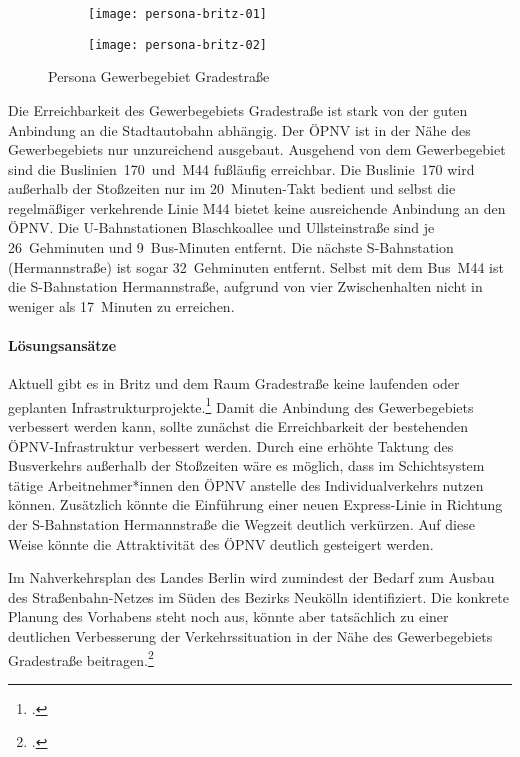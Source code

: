 \begin{figure}
    \centering
    \begin{subfigure}{.5\textwidth}
        \centering
        \texttt{[image: persona-britz-01]}
    \end{subfigure}%
    \begin{subfigure}{.5\textwidth}
        \centering
        \texttt{[image: persona-britz-02]}
    \end{subfigure}
    \caption{Persona Gewerbegebiet Gradestraße}
    \label{persona-britz}
\end{figure}

Die Erreichbarkeit des Gewerbegebiets Gradestraße ist stark von der guten Anbindung an die Stadtautobahn abhängig. Der ÖPNV ist in der Nähe des Gewerbegebiets nur unzureichend ausgebaut. Ausgehend von dem Gewerbegebiet sind die Buslinien~170~und~M44 fußläufig erreichbar. Die Buslinie~170 wird außerhalb der Stoßzeiten nur im 20~Minuten-Takt bedient und selbst die regelmäßiger verkehrende Linie M44 bietet keine ausreichende Anbindung an den ÖPNV. Die U-Bahnstationen Blaschkoallee und Ullsteinstraße sind je 26~Gehminuten und 9~Bus-Minuten entfernt. Die nächste S-Bahnstation (Hermannstraße) ist sogar 32~Gehminuten entfernt. Selbst mit dem Bus~M44 ist die S-Bahnstation Hermannstraße, aufgrund von vier Zwischenhalten nicht in weniger als 17~Minuten zu erreichen.

\paragraph{Lösungsansätze}

Aktuell gibt es in Britz und dem Raum Gradestraße keine laufenden oder geplanten Infrastrukturprojekte.\footcite{NahverkehrsplanBerlin} Damit die Anbindung des Gewerbegebiets verbessert werden kann, sollte zunächst die Erreichbarkeit der bestehenden ÖPNV-Infrastruktur verbessert werden. Durch eine erhöhte Taktung des Busverkehrs außerhalb der Stoßzeiten wäre es möglich, dass im Schichtsystem tätige Arbeitnehmer*innen den ÖPNV anstelle des Individualverkehrs nutzen können. Zusätzlich könnte die Einführung einer neuen Express-Linie in Richtung der S-Bahnstation Hermannstraße die Wegzeit deutlich verkürzen. Auf diese Weise könnte die Attraktivität des ÖPNV deutlich gesteigert werden.

Im Nahverkehrsplan des Landes Berlin wird zumindest der Bedarf zum Ausbau des Straßenbahn-Netzes im Süden des Bezirks Neukölln identifiziert. Die konkrete Planung des Vorhabens steht noch aus, könnte aber tatsächlich zu einer deutlichen Verbesserung der Verkehrssituation in der Nähe des Gewerbegebiets Gradestraße beitragen.\footcite{NahverkehrsplanBerlin}
